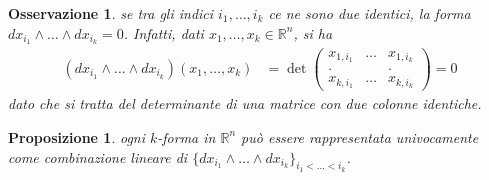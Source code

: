 \documentclass[oneside, 11pt]{amsbook}
\newcommand{\0}{{(0)}}
\newcommand{\3}{{(3)}}
\theoremstyle{colonplain}
\newtheorem{prop}[thm]{Proposizione}
\theoremstyle{colondefinition}
\theoremstyle{colonremark}
\newtheorem{rmk}[thm]{Osservazione}
\numberwithin{equation}{chapter}
\begin{document}
\begin{rmk} se tra gli indici $i_1, \dots, i_k$ ce ne sono due identici, la forma $dx_{i_1} \wedge \dots \wedge dx_{i_k} = 0$. Infatti, dati $x_1, \dots, x_k \in \mathbb{R}^n$, si ha 
\begin{align}
    (dx_{i_1} \wedge \dots \wedge dx_{i_k})(x_1, \dots, x_k) &= \det
    \begin{pmatrix}
        x_{1, i_1} & \dots & x_{1, i_k} \\
        . & & . \\
        x_{k, i_1} & \dots & x_{k, i_k}
    \end{pmatrix} = 0 
\end{align}
dato che si tratta del determinante di una matrice con due colonne identiche.
\end{rmk}
\begin{prop}\label{UniqueReprExtForm} ogni $k$-forma in $\mathbb{R}^n$ può essere rappresentata univocamente come combinazione lineare di $\{dx_{i_1} \wedge \dots \wedge dx_{i_k}\}_{i_1 < \dots < i_k}$.
\end{prop}
\end{document}
